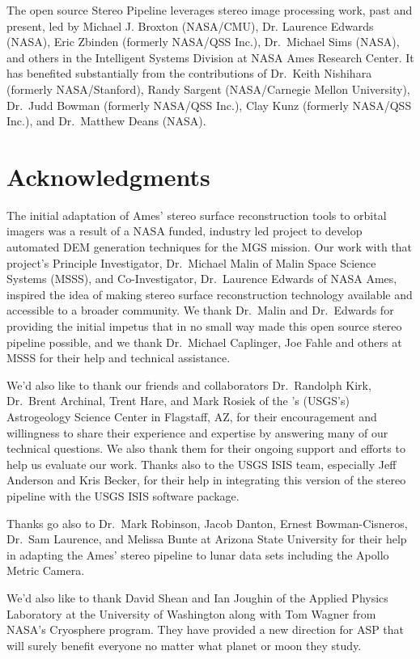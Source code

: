 The open source Stereo Pipeline leverages stereo image processing
work, past and present, led by Michael J. Broxton (NASA/CMU),
Dr. Laurence Edwards (NASA), Eric Zbinden (formerly NASA/QSS Inc.),
Dr.~Michael Sims (NASA), and others in the Intelligent Systems
Division at NASA Ames Research Center. It has benefited substantially
from the contributions of Dr.~Keith Nishihara (formerly
NASA/Stanford), Randy Sargent (NASA/Carnegie Mellon University),
Dr.~Judd Bowman (formerly NASA/QSS Inc.), Clay Kunz (formerly NASA/QSS
Inc.), and Dr.~Matthew Deans (NASA).

\section*{Acknowledgments}

The initial adaptation of Ames' stereo surface reconstruction tools to
orbital imagers was a result of a NASA funded, industry led project to
develop automated \ac{DEM} generation techniques for
the \ac{MGS} mission. Our work with that project's
Principle Investigator, Dr.~Michael Malin of Malin Space Science
Systems (MSSS), and Co-Investigator, Dr.~Laurence Edwards of NASA
Ames, inspired the idea of making stereo surface reconstruction
technology available and accessible to a broader community.  We thank
Dr.~Malin and Dr.~Edwards for providing the initial impetus that in no
small way made this open source stereo pipeline possible, and we thank
Dr.~Michael Caplinger, Joe Fahle and others at MSSS for their help and
technical assistance.

We'd also like to thank our friends and collaborators Dr.~Randolph
Kirk, Dr.~Brent Archinal, Trent Hare, and Mark Rosiek of the
's (\acs{USGS}'s) Astrogeology Science Center in Flagstaff,
AZ, for their encouragement and willingness to share their experience
and expertise by answering many of our technical questions.  We also
thank them for their ongoing support and efforts to help us evaluate
our work.  Thanks also to the \ac{USGS} \ac{ISIS} team, especially
Jeff Anderson and Kris Becker, for their help in integrating this
version of the stereo pipeline with the \ac{USGS} \ac{ISIS} software
package.

Thanks go also to Dr.~Mark Robinson, Jacob Danton, Ernest
Bowman-Cisneros, Dr.~Sam Laurence, and Melissa Bunte at Arizona State
University for their help in adapting the Ames' stereo pipeline to
lunar data sets including the Apollo Metric Camera.

We'd also like to thank David Shean and Ian Joughin of the Applied
Physics Laboratory at the University of Washington along with Tom
Wagner from NASA's Cryosphere program. They have provided a new
direction for ASP that will surely benefit everyone no matter what
planet or moon they study.

